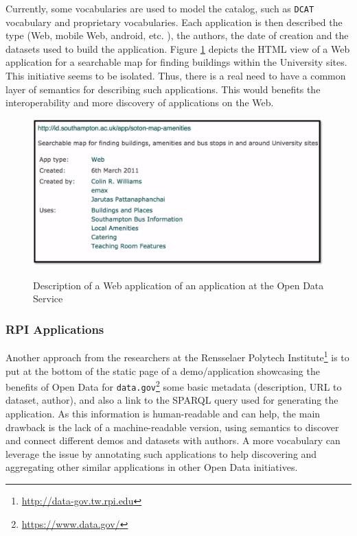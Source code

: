 Currently, some vocabularies are used to model the catalog, such as \texttt{DCAT} vocabulary \cite{dcat} and proprietary vocabularies. Each application is then described the type (Web, mobile Web, android, etc. ), the authors, the date of creation and the datasets used to build the application. Figure \ref{fig:app-amenity} depicts the HTML view of a Web application
for a searchable map for finding buildings within the University sites. This initiative seems to be isolated. Thus, there is a real need to have a common layer of semantics for describing such applications. This would benefits the interoperability and more discovery of applications on the Web.
\begin{figure}
\includegraphics[scale=.7]{img/soton-map-amenities.pdf}
\label{fig:app-amenity}
\vspace{-10pt}
\caption{Description of a Web application of an application at the Open Data Service}
\end{figure}

\subsubsection{RPI Applications}
Another approach from the researchers at the Rensselaer Polytech Institute\footnote{\url{http://data-gov.tw.rpi.edu}} is to put at the bottom of the static page of a demo/application showcasing the benefits of Open Data for \texttt{data.gov}\footnote{\url{https://www.data.gov/}} some basic metadata (description, URL to dataset, author), and also a link to the SPARQL query used for generating the application. As this information is human-readable and can help, the main drawback is the lack of a machine-readable version, using semantics to discover and connect different demos and datasets with authors. A more vocabulary can leverage the issue by annotating such applications to help discovering and aggregating other similar applications in other Open Data initiatives.  


